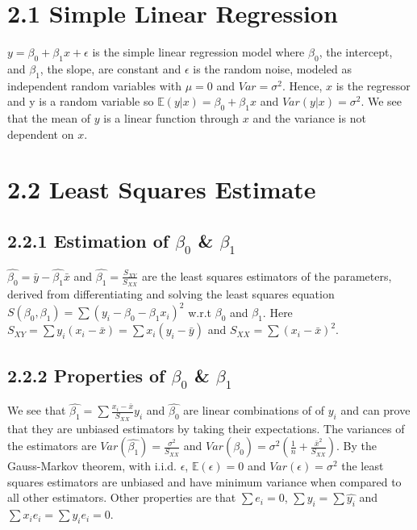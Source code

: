 \begin{multicols*}{3}
\setlength{\premulticols}{1pt}
\setlength{\postmulticols}{1pt}
\setlength{\multicolsep}{1pt}
\setlength{\columnsep}{2pt}

\section{2.1 Simple Linear Regression}
$y = \beta_0 + \beta_1 x + \epsilon$ is the simple linear regression model where $\beta_0$, the intercept, and $\beta_1$, the slope, are constant and $\epsilon$ is the random noise, modeled as independent random variables with $\mu = 0$ and $Var = \sigma^2$. Hence, $x$ is the regressor and y is a random variable so $\mathbb{E}(y|x) = \beta_0 + \beta_1 x$ and $Var(y|x) = \sigma^2$. We see that the mean of $y$ is a linear function through $x$ and the variance is not dependent on $x$.

\section{2.2 Least Squares Estimate}
\subsection{2.2.1 Estimation of $\beta_0$ \& $\beta_1$}
$\hat{\beta_0} = \bar{y} - \hat{\beta_1} \bar{x}$ and $\hat{\beta_1} = \frac{S_{XY}}{S_{XX}}$ are the least squares estimators of the parameters, derived from differentiating and solving the least squares equation $S(\beta_0, \beta_1 ) = \sum ( y_i - \beta_0 - \beta_1 x_i )^2$ w.r.t $\beta_0$ and $\beta_1$. Here $S_{XY} = \sum y_i (x_i - \bar{x}) = \sum x_i (y_i - \bar{y})$ and $S_{XX} = \sum(x_i - \bar{x})^2$.

\subsection{2.2.2 Properties of $\beta_0$ \& $\beta_1$}
We see that $\hat{\beta_1} = \sum \frac{x_i - \bar{x}}{S_{XX}} y_i$ and $\hat{\beta_0}$ are linear combinations of of $y_i$ and can prove that they are unbiased estimators by taking their expectations. The variances of the estimators are $Var(\hat{\beta_1}) = \frac{\sigma^2}{S_{XX}}$ and $Var(\hat{\beta_0}) = \sigma^2 (\frac{1}{n} + \frac{\bar{x}^2}{S_{XX}})$. By the Gauss-Markov theorem, with i.i.d. $\epsilon$, $\mathbb{E}(\epsilon) = 0$ and $Var(\epsilon) = \sigma^2$ the least squares estimators are unbiased and have minimum variance when compared to all other estimators. Other properties are that $\sum e_i = 0$, $\sum y_i = \sum \hat{y_i}$ and $\sum x_i e_i = \sum y_i e_i = 0$.


\end{multicols*}
